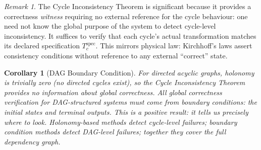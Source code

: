 \documentclass[twocolumn,a4paper,11pt]{article}
\theoremstyle{plain}
\newtheorem{corollary}[theorem]{Corollary}
\theoremstyle{definition}
\theoremstyle{remark}
\newtheorem{remark}[theorem]{Remark}
\begin{document}
\begin{remark}
The Cycle Inconsistency Theorem is significant because it provides a
correctness \emph{witness} requiring no external reference for the cycle
behaviour: one need not know the global purpose of the system to detect
cycle-level inconsistency. It suffices to verify that each cycle's actual
transformation matches its declared specification $T_c^{\mathrm{spec}}$.
This mirrors physical law: Kirchhoff's laws assert consistency conditions
without reference to any external ``correct'' state.
\end{remark}

\begin{corollary}[DAG Boundary Condition]
\label{cor:acyclic-invisible}
For directed acyclic graphs, holonomy is trivially zero (no directed cycles
exist), so the Cycle Inconsistency Theorem provides no information about
global correctness. All global correctness verification for DAG-structured
systems must come from \emph{boundary conditions}: the initial states and
terminal outputs. This is a positive result: it tells us precisely where
to look. Holonomy-based methods detect cycle-level failures; boundary
condition methods detect DAG-level failures; together they cover the full
dependency graph.
\end{corollary}
\end{document}
